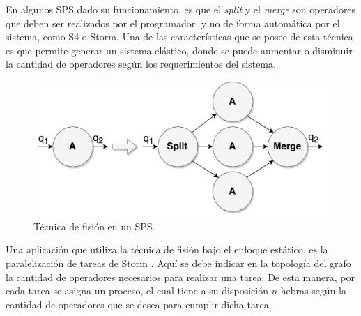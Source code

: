 En algunos SPS dado su funcionamiento, es que el \textit{split} y el \textit{merge} son operadores que deben ser realizados por el programador, y no de forma automática por el sistema, como S4 o Storm. Una de las características que se posee de esta técnica es que permite generar un sistema elástico, donde se puede aumentar o disminuir la cantidad de operadores según los requerimientos del sistema.

\begin{figure}[!ht]
	\centering
	\includegraphics[scale=0.4]{images/Fision.pdf}
	\caption{Técnica de fisión en un SPS.}
	\label{fig:fision}
\end{figure}



Una aplicación que utiliza la técnica de fisión bajo el enfoque estático, es la paralelización de tareas de Storm \citep{bookstorm}. Aquí se debe indicar en la topología del grafo la cantidad de operadores necesarios para realizar una tarea. De esta manera, por cada tarea se asigna un proceso, el cual tiene a su disposición $n$ hebras según la cantidad de operadores que se desea para cumplir dicha tarea.

